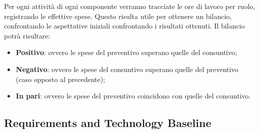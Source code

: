Per ogni attività di ogni componente verranno tracciate le ore di lavoro per ruolo, registrando le effettive spese. Questo risulta utile per ottenere un bilancio, confrontando le aspettative iniziali confrontando i risultati ottenuti. Il bilancio potrà risultare:
\begin{itemize}
    \item \textbf{Positivo}: ovvero le spese del preventivo superano quelle del consuntivo;
    \item \textbf{Negativo}: ovvero le spese del consuntivo superano quelle del preventivo (caso opposto al precedente);
    \item \textbf{In pari}: ovvero le spese del preventivo coincidono con quelle del consuntivo.
\end{itemize}

\subsection{Requirements and Technology Baseline} 
